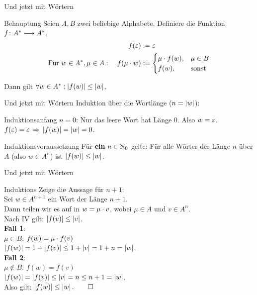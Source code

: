 \begin{frame}{Und jetzt mit Wörtern}
	\begin{block}{Behauptung}
		Seien $A, B$ zwei beliebige Alphabete. Definiere die Funktion $f \colon A^* \longrightarrow A^*$,
		\begin{align*}
			f(\varepsilon) &:= \varepsilon \\
			\text{Für } w \in A^*, \mu \in A: \quad f(\mu \cdot w) &:= 
			\begin{cases}
				\mu \cdot f(w), &\mu \in B \\
				f(w), &\text{sonst}
			\end{cases}\\
		\end{align*}
	
	Dann gilt $\forall w \in A^*: \left\lvert f(w) \right\rvert \le \left\lvert w \right\rvert$.
	\end{block}
\end{frame}

\begin{frame}{Und jetzt mit Wörtern}
	Induktion über die Wortlänge ($n = \left\lvert w \right\rvert$):\\[0.5em]
	\pause
	\begin{block}{Induktionsanfang}
		$n = 0$: Nur das leere Wort hat Länge 0. Also $w = \varepsilon$.\\
		$f(\eps) = \eps \impl \size{f(w)} = \size w = 0$. \; \textbf{\checked}
	\end{block}
	\pause
	\begin{block}{Induktionsvoraussetzung}
		Für \textbf{ein} $n \in \mathbb{N}_0$ gelte: Für alle Wörter der Länge $n$ über $A$ (also $w \in A^n$) ist $\left\lvert f(w) \right\rvert \le \left\lvert w \right\rvert$.
	\end{block}
\end{frame}

\begin{frame}{Und jetzt mit Wörtern}
	\begin{block}{Induktions}
		Zeige die Aussage für $n+1$:\\
		Sei $w \in A^{n+1}$ ein Wort der Länge $n+1$.\\
		\pause
		Dann teilen wir es auf in $w = \mu \cdot v$, wobei $\mu \in A$ und $v \in A^n$.\\
		Nach IV gilt: $\left\lvert f(v) \right\rvert \le \left\lvert v \right\rvert$.\\
		\pause
		\smallskip
		\textbf{Fall 1}: \\
			\quad $\mu \in B$: $f(w) = \mu \cdot f(v)$ \\
			\quad \impl $\left\lvert f(w) \right\rvert = 1 + \left\lvert f(v) \right\rvert \le 1 + \left\lvert v \right\rvert = 1+n = \left\lvert w \right\rvert$.\\
		\pause
		\smallskip
		\textbf{Fall 2}: \\
			\quad $\mu \notin B$: $f(w) = f(v)$ \\
			\quad \impl $\left\lvert f(w) \right\rvert = \left\lvert f(v) \right\rvert \le \left\lvert v \right\rvert = n \le n+1 = \left\lvert w \right\rvert$.\\
		\pause
		\smallskip
		Also gilt: $\left\lvert f(w) \right\rvert \le \left\lvert w \right\rvert. \qed$
	\end{block}
\end{frame}